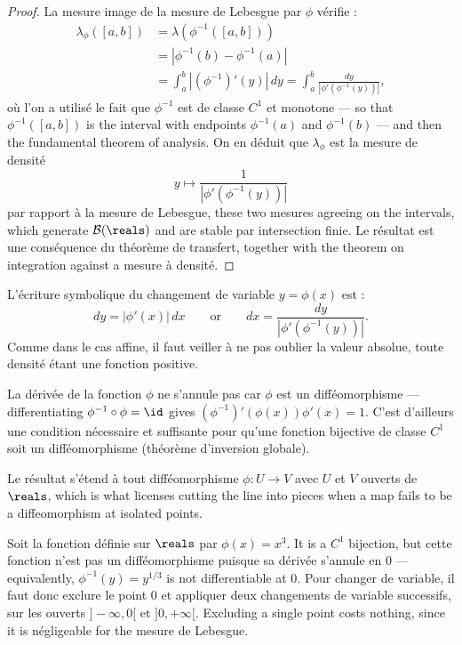 \begin{proof}
  La mesure image de la mesure de Lebesgue par $\phi$ vérifie :
  \begin{align*}
    \lambda_{\phi}([a,b]) &= \lambda(\phi^{-1}([a,b])) \\
      &= |\phi^{-1}(b) - \phi^{-1}(a)| \\
      &= \int_{a}^{b} |(\phi^{-1})'(y)| \, dy
       = \int_{a}^{b} \frac{dy}{|\phi'(\phi^{-1}(y))|} ,
  \end{align*}
  où l'on a utilisé le fait que $\phi^{-1}$ est de classe $C^{1}$ et monotone --- so
  that $\phi^{-1}([a,b])$ is the interval with endpoints $\phi^{-1}(a)$ and
  $\phi^{-1}(b)$ --- and then the fundamental theorem of analysis. On en déduit que
  $\lambda_{\phi}$ est la mesure de densité
  \[
    y \mapsto \frac{1}{|\phi'(\phi^{-1}(y))|}
  \]
  par rapport à la mesure de Lebesgue, these two mesures agreeing on the intervals,
  which generate $\mathcal{B}(\reals)$ and are stable par intersection finie. Le
  résultat est une conséquence du théorème de transfert, together with the theorem
  on integration against a mesure à densité.
\end{proof}

L'écriture symbolique du changement de variable $y = \phi(x)$ est :
\[
  dy = |\phi'(x)| \, dx
  \qquad \text{or} \qquad
  dx = \frac{dy}{|\phi'(\phi^{-1}(y))|} .
\]
Comme dans le cas affine, il faut veiller à ne pas oublier la valeur absolue, toute
densité étant une fonction positive.

\begin{remark}
  La dérivée de la fonction $\phi$ ne s'annule pas car $\phi$ est un
  difféomorphisme --- differentiating $\phi^{-1} \circ \phi = \id$ gives
  $(\phi^{-1})'(\phi(x)) \phi'(x) = 1$. C'est d'ailleurs une condition nécessaire et
  suffisante pour qu'une fonction bijective de classe $C^{1}$ soit un
  difféomorphisme (théorème d'inversion globale).
\end{remark}

Le résultat s'étend à tout difféomorphisme $\phi : U \to V$ avec $U$ et $V$ ouverts
de $\reals$, which is what licenses cutting the line into pieces when a map fails to
be a diffeomorphism at isolated points.

\begin{example}
  Soit la fonction définie sur $\reals$ par $\phi(x) = x^{3}$. It is a $C^{1}$
  bijection, but cette fonction n'est pas un difféomorphisme puisque sa dérivée
  s'annule en $0$ --- equivalently, $\phi^{-1}(y) = y^{1/3}$ is not differentiable
  at $0$. Pour changer de variable, il faut donc exclure le point $0$ et appliquer
  deux changements de variable successifs, sur les ouverts $]-\infty,0[$ et
  $]0,+\infty[$. Excluding a single point costs nothing, since it is négligeable for
  the mesure de Lebesgue.
\end{example}

